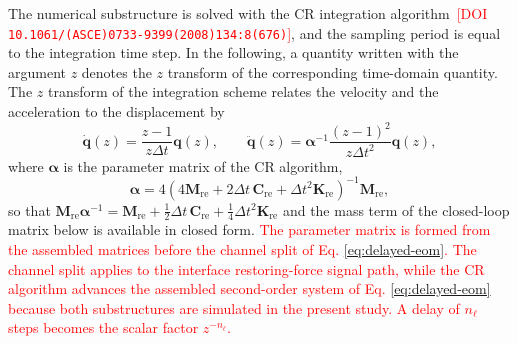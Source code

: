\documentclass[11pt,a4paper]{article}
\numberwithin{equation}{section}
\newcommand{\rev}[1]{\textcolor{red}{#1}}
\begin{document}
The numerical substructure is solved with the CR integration algorithm \cite{ChenRicles2008b}\,\rev{[DOI \nolinkurl{10.1061/(ASCE)0733-9399(2008)134:8(676)}]}, and the sampling period is equal to the integration time step. In the following, a quantity written with the argument \(z\) denotes the \(z\) transform of the corresponding time-domain quantity. The \(z\) transform of the integration scheme relates the velocity and the acceleration to the displacement by
\begin{equation}
	\dot{\bm{q}}(z)=\frac{z-1}{z\Delta t}\bm{q}(z),
	\qquad
	\ddot{\bm{q}}(z)=\bm{\alpha}^{-1}\frac{(z-1)^{2}}{z\Delta t^{2}}\bm{q}(z),
	\label{eq:z-derivatives}
\end{equation}
where \(\bm{\alpha}\) is the parameter matrix of the CR algorithm,
\begin{equation}
	\bm{\alpha}=4\left(4\mathbf{M}_{\mathrm{re}}
	+2\Delta t\,\mathbf{C}_{\mathrm{re}}
	+\Delta t^{2}\mathbf{K}_{\mathrm{re}}\right)^{-1}\mathbf{M}_{\mathrm{re}},
	\label{eq:cr-parameter}
\end{equation}
so that \(\mathbf{M}_{\mathrm{re}}\bm{\alpha}^{-1}
=\mathbf{M}_{\mathrm{re}}+\tfrac{1}{2}\Delta t\,\mathbf{C}_{\mathrm{re}}
+\tfrac{1}{4}\Delta t^{2}\mathbf{K}_{\mathrm{re}}\) and the mass term of the closed-loop matrix below is available in closed form. \rev{The parameter matrix is formed from the assembled matrices before the channel split of Eq. \eqref{eq:delayed-eom}. The channel split applies to the interface restoring-force signal path, while the CR algorithm advances the assembled second-order system of Eq. \eqref{eq:delayed-eom} because both substructures are simulated in the present study. A delay of \(n_{\ell}\) steps becomes the scalar factor \(z^{-n_{\ell}}\).}
\end{document}
